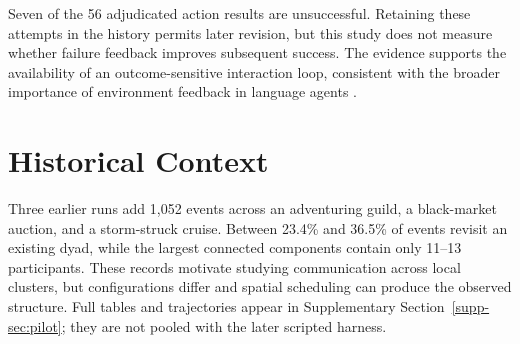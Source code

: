 Seven of the 56 adjudicated action results are unsuccessful. Retaining these
attempts in the history permits later revision, but this study does not measure
whether failure feedback improves subsequent success. The evidence supports
the availability of an outcome-sensitive interaction loop, consistent with
the broader importance of environment feedback in language agents
\cite{react,reflexion,voyager}.



\section{Historical Context}
Three earlier runs add 1,052 events across an adventuring guild, a black-market
auction, and a storm-struck cruise. Between 23.4\% and 36.5\% of events revisit
an existing dyad, while the largest connected components contain only 11--13
participants. These records motivate studying communication across local
clusters, but configurations differ and spatial scheduling can produce the
observed structure. Full tables and trajectories appear in
Supplementary Section~\ref{supp-sec:pilot}; they are not pooled with the later scripted harness.
